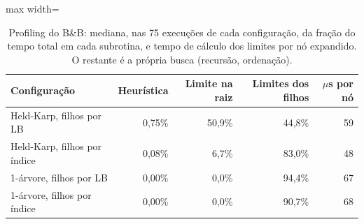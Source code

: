 \begin{table}[htb]
\centering
\caption{Profiling do B\&B: mediana, nas 75 execuções de cada configuração, da fração do tempo total em cada subrotina, e tempo de cálculo dos limites por nó expandido. O restante é a própria busca (recursão, ordenação).}
\label{tab:perfil}
\small
\begin{adjustbox}{max width=\linewidth}
\begin{tabular}{lrrrr}
\toprule
Configuração & Heurística & Limite na raiz & Limites dos filhos & $\mu$s por nó \\
\midrule
Held-Karp, filhos por LB & 0{,}75\% & 50{,}9\% & 44{,}8\% & 59 \\
Held-Karp, filhos por índice & 0{,}08\% & 6{,}7\% & 83{,}0\% & 48 \\
1-árvore, filhos por LB & 0{,}00\% & 0{,}0\% & 94{,}4\% & 67 \\
1-árvore, filhos por índice & 0{,}00\% & 0{,}0\% & 90{,}7\% & 68 \\
\bottomrule
\end{tabular}
\end{adjustbox}
\end{table}
